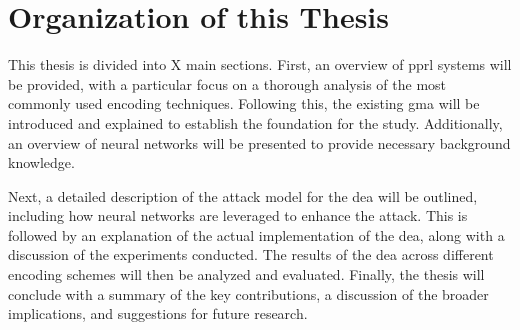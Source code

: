 \section{Organization of this Thesis}  \label{sec:orga}

This thesis is divided into X main sections. First, an overview of \ac{pprl} systems will be provided, with a particular focus on a thorough analysis of the most commonly used encoding techniques. Following this, the existing \ac{gma} will be introduced and explained to establish the foundation for the study. Additionally, an overview of neural networks will be presented to provide necessary background knowledge.

Next, a detailed description of the attack model for the \ac{dea} will be outlined, including how neural networks are leveraged to enhance the attack. This is followed by an explanation of the actual implementation of the \ac{dea}, along with a discussion of the experiments conducted. The results of the \ac{dea} across different encoding schemes will then be analyzed and evaluated. Finally, the thesis will conclude with a summary of the key contributions, a discussion of the broader implications, and suggestions for future research.